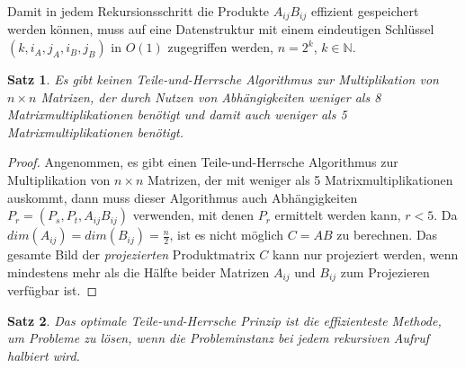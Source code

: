 \documentclass[oneside]{scrbook}
\newtheorem{satz}{Satz}[section]
\numberwithin{equation}{section}
\begin{document}
Damit in jedem Rekursionsschritt die Produkte $A_{ij}B_{ij}$ effizient gespeichert werden können, muss auf eine Datenstruktur mit einem eindeutigen Schlüssel $(k, i_{A}, j_{A}, i_{B}, j_{B})$ in $O(1)$ zugegriffen werden, $n = 2^k$, $k \in \mathbb{N}$.
\begin{satz}
	Es gibt keinen Teile-und-Herrsche Algorithmus zur Multiplikation von $n \times n$ Matrizen, der durch Nutzen von Abhängigkeiten weniger als 8 Matrixmultiplikationen benötigt und damit auch weniger als 5 Matrixmultiplikationen benötigt. 
\end{satz}
\begin{proof}
	Angenommen, es gibt einen Teile-und-Herrsche Algorithmus zur Multiplikation von $n \times n$ Matrizen, der mit weniger als 5 Matrixmultiplikationen auskommt, dann muss dieser Algorithmus auch Abhängigkeiten $P_r = (P_s, P_t, A_{ij}B_{ij})$ verwenden, mit denen $P_r$ ermittelt werden kann, $r < 5$. Da $dim(A_{ij}) = dim(B_{ij}) = \frac{n}{2}$, ist es nicht möglich $C = AB$ zu berechnen. Das gesamte Bild der \textit{projezierten} Produktmatrix $C$ kann nur projeziert werden, wenn mindestens mehr als die Hälfte beider Matrizen $A_{ij}$ und $B_{ij}$ zum Projezieren verfügbar ist.
\end{proof}
\begin{satz}
	Das optimale Teile-und-Herrsche Prinzip ist die effizienteste Methode, um Probleme zu lösen, wenn die Probleminstanz bei jedem rekursiven Aufruf halbiert wird. 
\end{satz}
\end{document}
